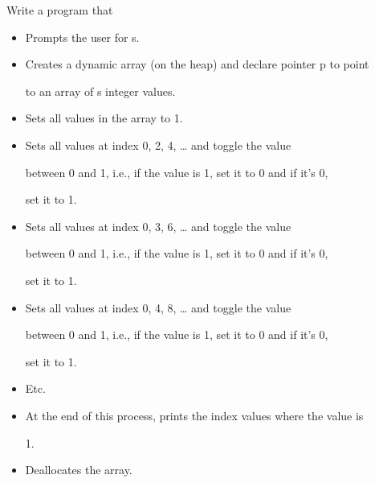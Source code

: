 Write a program that



\begin{itemize}

\item Prompts the user for s.

\item Creates a dynamic array (on the heap) and declare pointer p to point

  to an array of s integer values.

\item Sets all values in the array to 1.

\item Sets all values at index 0, 2, 4, \ldots{} and toggle the value

  between 0 and 1, i.e., if the value is 1, set it to 0 and if it's 0,

  set it to 1.

\item Sets all values at index 0, 3, 6, \ldots{} and toggle the value

  between 0 and 1, i.e., if the value is 1, set it to 0 and if it's 0,

  set it to 1.

\item Sets all values at index 0, 4, 8, \ldots{} and toggle the value

  between 0 and 1, i.e., if the value is 1, set it to 0 and if it's 0,

  set it to 1.

\item Etc.

\item At the end of this process, prints the index values where the value is

  1.

\item Deallocates the array.

\end{itemize}

